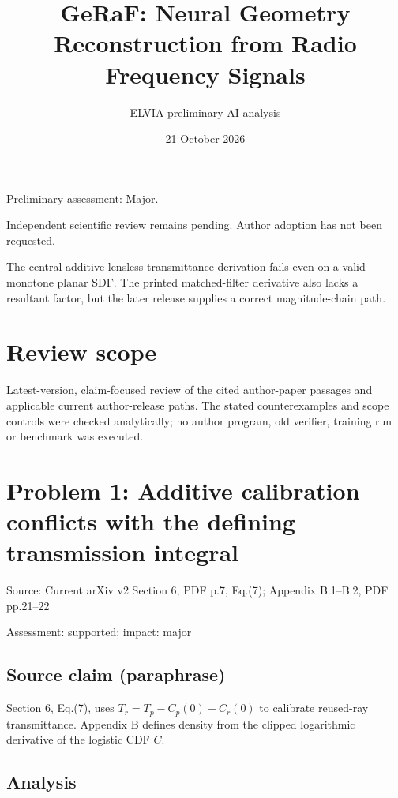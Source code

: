 \documentclass[11pt]{article}
\begin{document}
\title{GeRaF: Neural Geometry Reconstruction from Radio Frequency Signals}

\author{ELVIA preliminary AI analysis}\date{21 October 2026}\maketitle

Preliminary assessment: Major.\par

Independent scientific review remains pending. Author adoption has not been requested.

The central additive lensless-transmittance derivation fails even on a valid monotone planar SDF. The printed matched-filter derivative also lacks a resultant factor, but the later release supplies a correct magnitude-chain path.

\section*{Review scope}

Latest-version, claim-focused review of the cited author-paper passages and applicable current author-release paths. The stated counterexamples and scope controls were checked analytically; no author program, old verifier, training run or benchmark was executed.

\section*{Problem 1: Additive calibration conflicts with the defining transmission integral}

Source: Current arXiv v2 Section 6, PDF p.7, Eq.(7); Appendix B.1–B.2, PDF pp.21–22

Assessment: supported; impact: major

\subsection*{Source claim (paraphrase)}

Section 6, Eq.(7), uses \(T_r=T_p-C_p(0)+C_r(0)\) to calibrate reused-ray transmittance. Appendix B defines density from the clipped logarithmic derivative of the logistic CDF \(C\).

\subsection*{Analysis}
\end{document}
